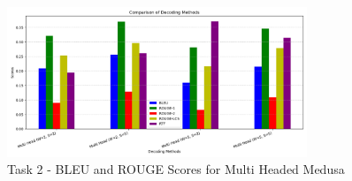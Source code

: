 \documentclass[12pt]{article}
\begin{document}
\begin{figure}[htbp]
    \centering
    \includegraphics[width=0.8\textwidth]{task2_multi.png}
    \caption{Task 2 - BLEU and ROUGE Scores for Multi Headed Medusa}
    \label{fig:task2_multi}
\end{figure}
\end{document}
